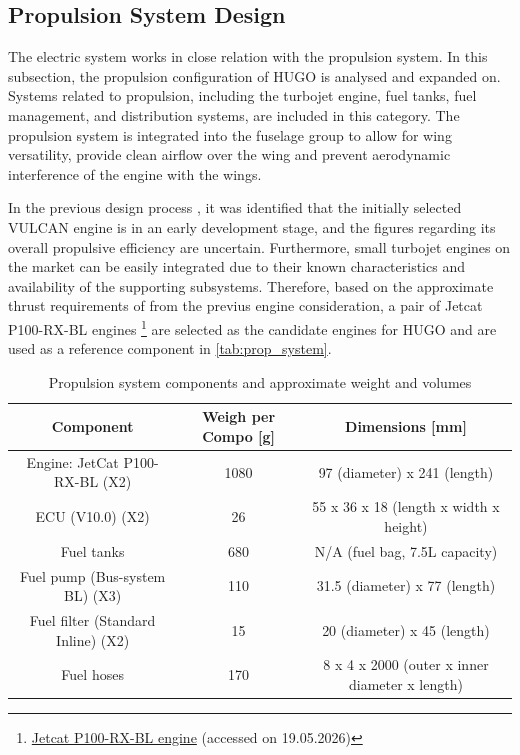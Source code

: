 \subsection{Propulsion System Design}
\label{sub:propulsion_system_design}
The electric system works in close relation with the propulsion system. In this subsection, the propulsion configuration of HUGO is analysed and expanded on. Systems related to propulsion, including the turbojet engine, fuel tanks, fuel management, and distribution systems, are included in this category. The propulsion system is integrated into the fuselage group to allow for wing versatility, provide clean airflow over the wing and prevent aerodynamic interference of the engine with the wings. 



In the previous design process , it was identified that the initially selected VULCAN engine is in an early development stage, and the figures regarding its overall propulsive efficiency are uncertain. Furthermore, small turbojet engines on the market can be easily integrated due to their known characteristics and availability of the supporting subsystems. Therefore, based on the approximate thrust requirements of from the previus engine consideration, a pair of Jetcat P100-RX-BL engines \footnote{\href{https://www.jetcat.de/de/productdetails/produkte/jetcat/produkte/RC\%20ENGINES/Engines/p100_rx-bl}{Jetcat P100-RX-BL engine} (accessed on 19.05.2026)} are selected as the candidate engines for HUGO and are used as a reference component in \autoref{tab:prop_system}.



\begin{table}[H]
    \centering
    \caption{Propulsion system components and approximate weight and volumes}
    \begin{tabular}{|c|c|c|}
        \hline
        \textbf{Component} & \textbf{Weigh per Compo [g]} & \textbf{Dimensions [mm]}  \\
        \hline\hline
        Engine: JetCat P100-RX-BL (X2) & 1080 & 97 (diameter) x 241 (length)\\
        \hline
        ECU (V10.0) (X2) & 26 & 55 x 36 x 18 (length x width x height) \\
        \hline
        Fuel tanks & 680 & N/A (fuel bag, 7.5L capacity)\\
        \hline
        Fuel pump (Bus-system BL) (X3)& 110 & 31.5 (diameter) x 77 (length)\\
        \hline
        Fuel filter (Standard Inline) (X2)& 15 & 20 (diameter) x 45 (length) \\
        \hline
        Fuel hoses & 170 & 8 x 4 x 2000 (outer x inner diameter x length) \\
        \hline
    \end{tabular}
    \label{tab:prop_system}
\end{table}


